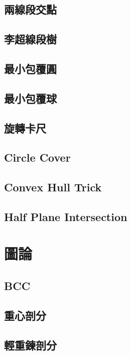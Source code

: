 \documentclass[a4paper,10pt,twocolumn,oneside]{article}
\begin{document}
\subsection{兩線段交點}

\subsection{李超線段樹}

\subsection{最小包覆圓}

\subsection{最小包覆球}

\subsection{旋轉卡尺}

\subsection{Circle Cover}

\subsection{Convex Hull Trick}

\subsection{Half Plane Intersection}

\section{圖論}
\subsection{BCC}

\subsection{重心剖分}

\subsection{輕重鍊剖分}

\end{document}
